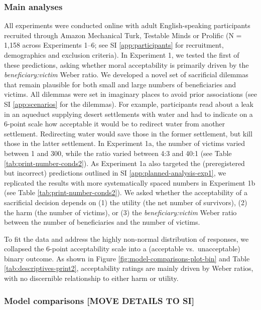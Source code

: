 \documentclass[
]{article}
\begin{document}
\subsubsection{Main analyses}\label{main-analyses}

All experiments were conducted online with adult English-speaking participants recruited through Amazon Mechanical Turk, Testable Minds or Prolific (N = 1,158 across Experiments 1--6; see SI \ref{app:participants} for recruitment, demographics and exclusion criteria). In Experiment 1, we tested the first of these predictions, asking whether moral acceptability is primarily driven by the \emph{beneficiary:victim} Weber ratio. We developed a novel set of sacrificial dilemmas that remain plausible for both small and large numbers of beneficiaries and victims. All dilemmas were set in imaginary places to avoid prior associations (see SI \ref{app:scenarios} for the dilemmas). For example, participants read about a leak in an aqueduct supplying desert settlements with water and had to indicate on a 6-point scale how acceptable it would be to redirect water from another settlement. Redirecting water would save those in the former settlement, but kill those in the latter settlement. In Experiment 1a, the number of victims varied between 1 and 300, while the ratio varied between 4:3 and 40:1 (see Table \ref{tab:print-number-conds2}). As Experiment 1a also targeted the (preregistered but incorrect) predictions outlined in SI \ref{app:planned-analysis-exp1}, we replicated the results with more systematically spaced numbers in Experiment 1b (see Table \ref{tab:print-number-conds2}). We asked whether the acceptability of a sacrificial decision depends on (1) the utility (the net number of survivors), (2) the harm (the number of victims), or (3) the \emph{beneficiary:victim} Weber ratio between the number of beneficiaries and the number of victims.

To fit the data and address the highly non-normal distribution of responses, we collapsed the 6-point acceptability scale into a (acceptable vs.~unacceptable) binary outcome. As shown in Figure \ref{fig:model-comparisons-plot-bin} and Table \ref{tab:descriptives-print2}, acceptability ratings are mainly driven by Weber ratios, with no discernible relationship to either harm or utility.

\subsubsection{Model comparisons {[}MOVE DETAILS TO SI{]}}\label{model-comparisons-move-details-to-si}
\end{document}
